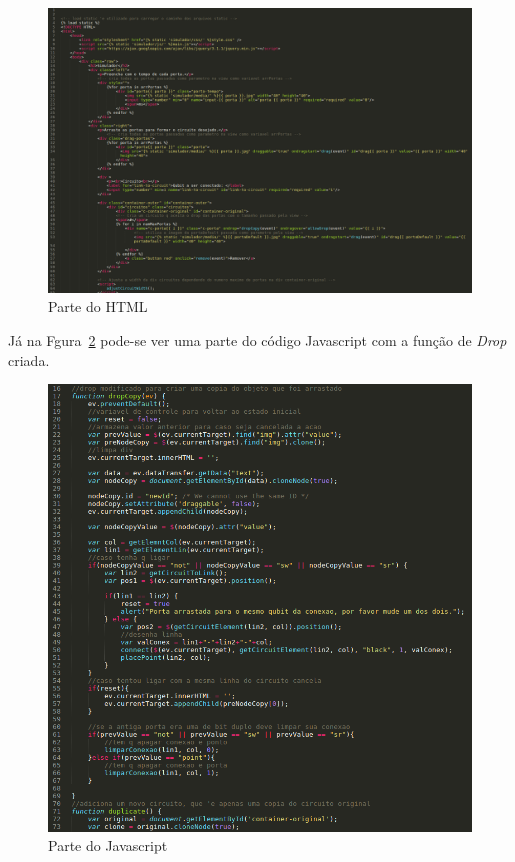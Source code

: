 \documentclass[a4paper, 12pt, oneside]{book}
\begin{document}
\begin{figure}[H]
\centering
\includegraphics[scale=0.3]{index.png}
\caption{Parte do HTML}
\label{fig:resHtml}
\end{figure}

Já na Fgura~\ref{fig:resJavascript} pode-se ver uma parte do código Javascript com a função de \textit{Drop} criada.

\begin{figure}[H]
\centering
\includegraphics[scale=0.5]{javascript.png}
\caption{Parte do Javascript}
\label{fig:resJavascript}
\end{figure}
\end{document}

